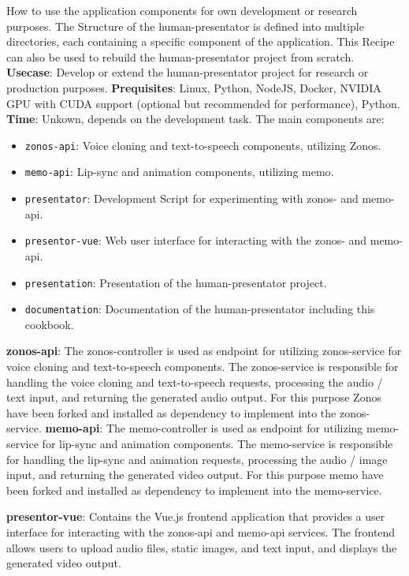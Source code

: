 How to use the application components for own development or research purposes. The Structure of the human-presentator is defined into multiple directories, each containing a specific component of the application. 
This Recipe can also be used to rebuild the human-presentator project from scratch. 
\textbf{Usecase}: Develop or extend the human-presentator project for research or production purposes.
\textbf{Prequisites}: Linux, Python, NodeJS, Docker, NVIDIA GPU with CUDA support (optional but recommended for performance), Python.
\textbf{Time}: Unkown, depends on the development task.
The main components are:
\begin{itemize}
    \item \texttt{zonos-api}: Voice cloning and text-to-speech components, utilizing \gls{Zonos}.
    \item \texttt{memo-api}: Lip-sync and animation components, utilizing \gls{memo}.
    \item \texttt{presentator}: Development Script for experimenting with zonos- and memo-api.
    \item \texttt{presentor-vue}: Web user interface for interacting with the zonos- and memo-api.
    \item \texttt{presentation}: Presentation of the human-presentator project.
    \item \texttt{documentation}: Documentation of the human-presentator including this cookbook.
\end{itemize}

\textbf{zonos-api}: The zonos-controller is used as endpoint for utilizing zonos-service for voice cloning and text-to-speech components. 
The zonos-service is responsible for handling the voice cloning and text-to-speech requests, processing the audio / text input, and returning the generated audio output. 
For this purpose \gls{Zonos} have been forked and installed as dependency to implement into the zonos-service.
\textbf{memo-api}: The memo-controller is used as endpoint for utilizing memo-service for lip-sync and animation components.
The memo-service is responsible for handling the lip-sync and animation requests, processing the audio / image input, and returning the generated video output.
For this purpose \gls{memo} have been forked and installed as dependency to implement into the memo-service.

\textbf{presentor-vue}: Contains the Vue.js frontend application that provides a user interface for interacting with the zonos-api and memo-api services.
The frontend allows users to upload audio files, static images, and text input, and displays the generated video output.